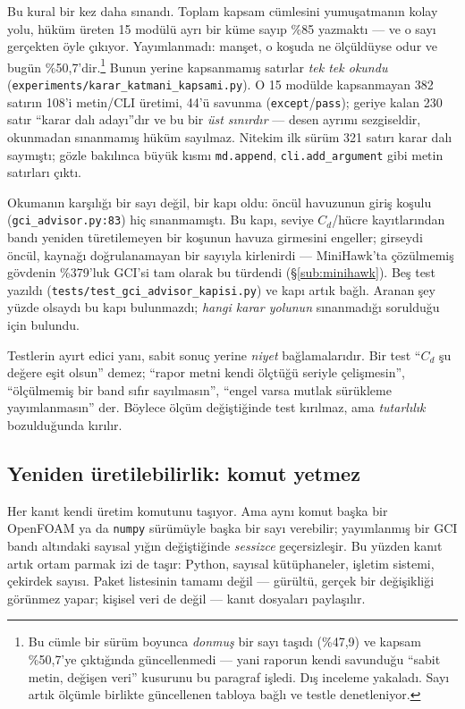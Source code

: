 \documentclass[11pt,a4paper]{article}
\begin{document}
Bu kural bir kez daha sınandı. Toplam kapsam cümlesini yumuşatmanın kolay yolu,
hüküm üreten 15 modülü ayrı bir küme sayıp \%85 yazmaktı --- ve o sayı gerçekten
öyle çıkıyor. Yayımlanmadı: manşet, o koşuda ne ölçüldüyse odur ve bugün
\%50{,}7'dir.\footnote{Bu cümle bir sürüm boyunca \emph{donmuş} bir sayı
taşıdı (\%47{,}9) ve kapsam \%50{,}7'ye çıktığında güncellenmedi --- yani
raporun kendi savunduğu ``sabit metin, değişen veri'' kusurunu bu paragraf
işledi. Dış inceleme yakaladı. Sayı artık ölçümle birlikte güncellenen tabloya
bağlı ve testle denetleniyor.} Bunun yerine
kapsanmamış satırlar \emph{tek tek okundu}
(\texttt{experiments/karar\_katmani\_kapsami.py}). O 15 modülde kapsanmayan 382
satırın 108'i metin/CLI üretimi, 44'ü savunma (\texttt{except}/\texttt{pass});
geriye kalan 230 satır ``karar dalı adayı''dır ve bu bir \emph{üst sınırdır} ---
desen ayrımı sezgiseldir, okunmadan sınanmamış hüküm sayılmaz. Nitekim ilk
sürüm 321 satırı karar dalı saymıştı; gözle bakılınca büyük kısmı
\texttt{md.append}, \texttt{cli.add\_argument} gibi metin satırları çıktı.

Okumanın karşılığı bir sayı değil, bir kapı oldu: öncül havuzunun giriş koşulu
(\texttt{gci\_advisor.py:83}) hiç sınanmamıştı. Bu kapı, seviye $C_d$/hücre
kayıtlarından bandı yeniden türetilemeyen bir koşunun havuza girmesini engeller;
girseydi öncül, kaynağı doğrulanamayan bir sayıyla kirlenirdi --- MiniHawk'ta
çözülmemiş gövdenin \%379'luk GCI'si tam olarak bu türdendi
(\S\ref{sub:minihawk}). Beş test yazıldı
(\texttt{tests/test\_gci\_advisor\_kapisi.py}) ve kapı artık bağlı. Aranan şey
yüzde olsaydı bu kapı bulunmazdı; \emph{hangi karar yolunun} sınanmadığı
sorulduğu için bulundu.

Testlerin ayırt edici yanı, sabit sonuç yerine \emph{niyet} bağlamalarıdır. Bir
test ``$C_d$ şu değere eşit olsun'' demez; ``rapor metni kendi ölçtüğü seriyle
çelişmesin'', ``ölçülmemiş bir band sıfır sayılmasın'', ``engel varsa mutlak
sürükleme yayımlanmasın'' der. Böylece ölçüm değiştiğinde test kırılmaz, ama
\emph{tutarlılık} bozulduğunda kırılır.

\subsection*{Yeniden üretilebilirlik: komut yetmez}

Her kanıt kendi üretim komutunu taşıyor. Ama aynı komut başka bir OpenFOAM ya da
\texttt{numpy} sürümüyle başka bir sayı verebilir; yayımlanmış bir GCI bandı
altındaki sayısal yığın değiştiğinde \emph{sessizce} geçersizleşir. Bu yüzden
kanıt artık ortam parmak izi de taşır: Python, sayısal kütüphaneler, işletim
sistemi, çekirdek sayısı. Paket listesinin tamamı değil --- gürültü, gerçek bir
değişikliği görünmez yapar; kişisel veri de değil --- kanıt dosyaları paylaşılır.
\end{document}
